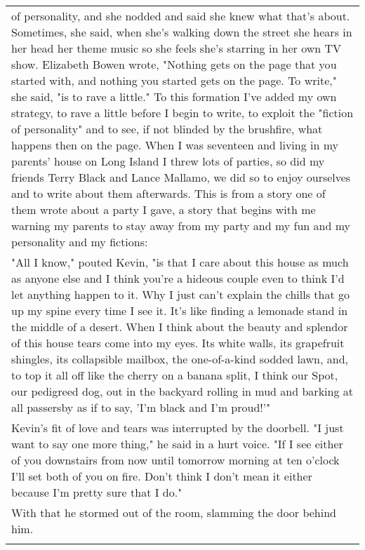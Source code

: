 \begin{longtable}[]{@{}l@{}}
\begin{minipage}[t]{0.97\columnwidth}
of personality, and she nodded and said she knew what that's about.
Sometimes, she said, when she's walking down the street she hears in her
head her theme music so she feels she's starring in her own TV show.
Elizabeth Bowen wrote, "Nothing gets on the page that you started with,
and nothing you started gets on the page. To write," she said, "is to
rave a little." To this formation I've added my own strategy, to rave a
little before I begin to write, to exploit the "fiction of personality"
and to see, if not blinded by the brushfire, what happens then on the
page. When I was seventeen and living in my parents' house on Long
Island I threw lots of parties, so did my friends Terry Black and Lance
Mallamo, we did so to enjoy ourselves and to write about them
afterwards. This is from a story one of them wrote about a party I gave,
a story that begins with me warning my parents to stay away from my
party and my fun and my personality and my fictions:\strut
\end{minipage}\tabularnewline
\begin{minipage}[t]{0.97\columnwidth}\raggedright
"All I know," pouted Kevin, "is that I care about this house as much as
anyone else and I think you're a hideous couple even to think I'd let
anything happen to it. Why I just can't explain the chills that go up my
spine every time I see it. It's like finding a lemonade stand in the
middle of a desert. When I think about the beauty and splendor of this
house tears come into my eyes. Its white walls, its grapefruit shingles,
its collapsible mailbox, the one-of-a-kind sodded lawn, and, to top it
all off like the cherry on a banana split, I think our Spot, our
pedigreed dog, out in the backyard rolling in mud and barking at all
passersby as if to say, 'I'm black and I'm proud!'"\strut
\end{minipage}\tabularnewline
\begin{minipage}[t]{0.97\columnwidth}\raggedright
Kevin's fit of love and tears was interrupted by the doorbell. "I just
want to say one more thing," he said in a hurt voice. "If I see either
of you downstairs from now until tomorrow morning at ten o'clock I'll
set both of you on fire. Don't think I don't mean it either because I'm
pretty sure that I do."\strut
\end{minipage}\tabularnewline
\begin{minipage}[t]{0.97\columnwidth}\raggedright
With that he stormed out of the room, slamming the door behind
him.\strut
\end{minipage}\tabularnewline
\begin{minipage}[t]{0.97\columnwidth}\raggedright

\end{minipage}
\end{longtable}
